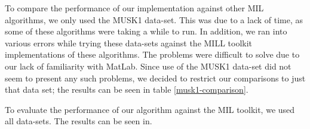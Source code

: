 \documentclass[conference]{IEEEtran}
\begin{document}
To compare the performance of our implementation against other MIL algorithms, we only used the MUSK1 data-set. This was due to a lack of time, as some of these algorithms were taking a while to run. In addition, we ran into various errors while trying these data-sets against the MILL toolkit implementations of these algorithms. The problems were difficult to solve due to our lack of familiarity with MatLab. Since use of the MUSK1 data-set did not seem to present any such problems, we decided to restrict our comparisons to just that data set; the results can be seen in table \ref{musk1-comparison}.

To evaluate the performance of our algorithm against the MIL toolkit, we used all data-sets. The results can be seen in.

\begin{table}[t]
\centering
\caption{Comparison of accuracy on MUSK1 data-set accross EM-DD implementations and other MIL algorithms}
\label{musk1-comparison}
\end{table}
\end{document}
